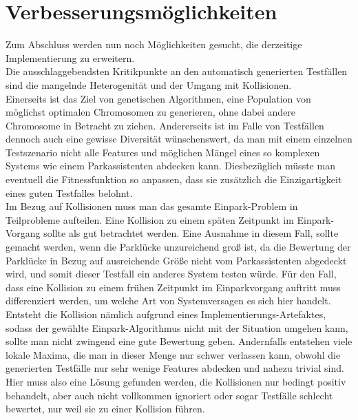 \documentclass[12pt,a4paper]{article}
\begin{document}
\section{Verbesserungsmöglichkeiten}
Zum Abschluss werden nun noch Möglichkeiten gesucht, die derzeitige Implementierung zu erweitern.\\
Die ausschlaggebendsten Kritikpunkte an den automatisch generierten Testfällen sind die mangelnde Heterogenität und der Umgang mit Kollisionen.\\
Einerseits ist das Ziel von genetischen Algorithmen, eine Population von möglichst optimalen Chromosomen zu generieren, ohne dabei andere Chromosome in Betracht zu ziehen. Andererseits ist im Falle von Testfällen dennoch auch eine gewisse Diversität wünschenswert, da man mit einem einzelnen Testszenario nicht alle Features und möglichen Mängel eines so komplexen Systems wie einem Parkassistenten abdecken kann. Diesbezüglich müsste man eventuell die Fitnessfunktion so anpassen, dass sie zusätzlich die Einzigartigkeit eines guten Testfalles belohnt.\\
Im Bezug auf Kollisionen muss man das gesamte Einpark-Problem in Teilprobleme aufteilen. Eine Kollision zu einem späten Zeitpunkt im Einpark-Vorgang sollte als gut betrachtet werden. Eine Ausnahme in diesem Fall, sollte gemacht werden, wenn die Parklücke unzureichend groß ist, da die Bewertung der Parklücke in Bezug auf ausreichende Größe nicht vom Parkassistenten abgedeckt wird, und somit dieser Testfall ein anderes System testen würde. Für den Fall, dass eine Kollision zu einem frühen Zeitpunkt im Einparkvorgang auftritt muss differenziert werden, um welche Art von Systemversagen es sich hier handelt. Entsteht die Kollision nämlich aufgrund eines Implementierungs-Artefaktes, sodass der gewählte Einpark-Algorithmus nicht mit der Situation umgehen kann, sollte man nicht zwingend eine gute Bewertung geben. Andernfalls entstehen viele lokale Maxima, die man in dieser Menge nur schwer verlassen kann, obwohl die generierten Testfälle nur sehr wenige Features abdecken und nahezu trivial sind. Hier muss also eine Lösung gefunden werden, die Kollisionen nur bedingt positiv behandelt, aber auch nicht vollkommen ignoriert oder sogar Testfälle schlecht bewertet, nur weil sie zu einer Kollision führen.
\end{document}
